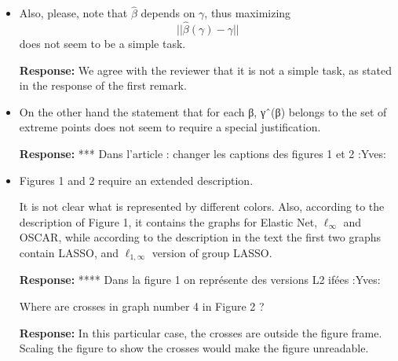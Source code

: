 \documentclass[a4paper,11pt]{texMemo}
\newenvironment{comment}
{
   \par\medskip \color{black}%
   \textbf{Response: }}
{\medskip}
\newenvironment{remark}
{\begin{itshape} \color{gray}}
{\end{itshape}}
\begin{document}
\begin{itemize}
\item
   \begin{remark}
     Also, please, note that $\hat{\beta}$ depends on $\gamma$, thus
     maximizing $$||\hat{\beta}(\gamma) -  \gamma||$$ does not seem to be a
     simple task.
   \end{remark}

   \begin{comment}
     We agree with the reviewer that it is not a simple task, as
     stated in the response of the first remark.
\end{comment}


\item
     \begin{remark}
       On the other hand the statement that for each β, γˆ(β) belongs
       to the set of extreme points does not seem to require a special
       justification.
     \end{remark}

   \begin{comment}
  *** Dans l'article : changer les captions des figures 1 et 2 :Yves:
   \end{comment}

\item
  \begin{remark}
    Figures 1 and 2 require an extended description.

    It is not clear what is represented by different colors.  Also,
    according to the description of Figure 1, it contains the graphs
    for Elastic Net, $\ell_\infty$ and OSCAR, while according to the
    description in the text the first two graphs contain LASSO, and
    $\ell_{1,\infty}$ version of group LASSO.
  \end{remark}

  \begin{comment}
  **** Dans la figure 1 on représente des versions L2 ifées :Yves:
\end{comment}

 \begin{remark}
   Where are crosses in graph number 4 in Figure 2 ?
 \end{remark}
 
 \begin{comment}
   In this particular case, the crosses are outside the figure
   frame. Scaling the figure to show the crosses would make the figure
   unreadable.
\end{comment}


\end{itemize}
\end{document}
